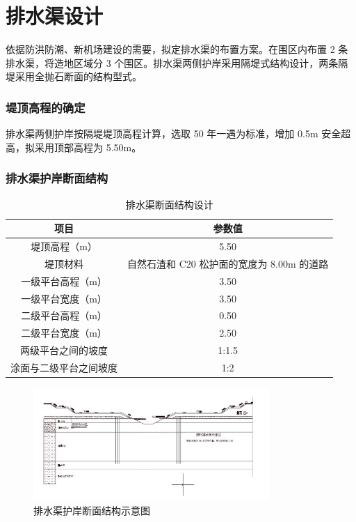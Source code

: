 \documentclass[UTF8, a4paper, 12pt]{ctexart} %
\begin{document}
\section{排水渠设计}
依据防洪防潮、新机场建设的需要，拟定排水渠的布置方案。在围区内布置 2 条排水渠，将造地区域分 3 个围区。排水渠两侧护岸采用隔堤式结构设计，两条隔堤采用全抛石断面的结构型式。

\subsubsection{堤顶高程的确定}
排水渠两侧护岸按隔堤堤顶高程计算，选取 50 年一遇为标准，增加 0.5m 安全超高，拟采用顶部高程为 5.50m。
\newpage
\subsubsection{排水渠护岸断面结构}
\begin{table}[h]
    \centering
    \caption{排水渠断面结构设计}
    \begin{tabular}{|c|c|}
        \hline
        \textbf{项目} & \textbf{参数值} \\ \hline
        堤顶高程（m） & 5.50 \\ \hline
        堤顶材料 & 自然石渣和 C20 松护面的宽度为 8.00m 的道路 \\ \hline
        一级平台高程（m） & 3.50 \\ \hline
        一级平台宽度（m） & 3.50 \\ \hline
        二级平台高程（m） & 0.50 \\ \hline
        二级平台宽度（m） & 2.50 \\ \hline
        两级平台之间的坡度 & 1:1.5 \\ \hline
        涂面与二级平台之间坡度 & 1:2 \\ \hline
    \end{tabular}
    \label{tab:drainage_channel_structure}
\end{table}

\begin{figure}[h]
    \centering
    \includegraphics[width=0.8\textwidth]{666.png}
    \caption{排水渠护岸断面结构示意图}
    \label{fig:drainage_channel_structure}
\end{figure}
\end{document}
